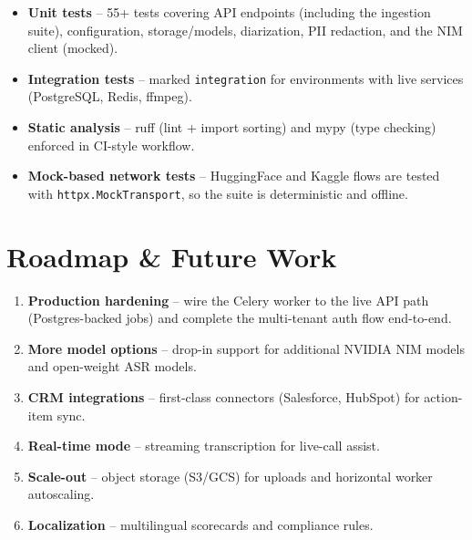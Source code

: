 \documentclass[11pt,a4paper]{article}
\begin{document}
\begin{itemize}
  \item \textbf{Unit tests} -- 55+ tests covering API endpoints (including the ingestion
        suite), configuration, storage/models, diarization, PII redaction, and the NIM
        client (mocked).
  \item \textbf{Integration tests} -- marked \texttt{integration} for environments with
        live services (PostgreSQL, Redis, ffmpeg).
  \item \textbf{Static analysis} -- ruff (lint + import sorting) and mypy (type checking)
        enforced in CI-style workflow.
  \item \textbf{Mock-based network tests} -- HuggingFace and Kaggle flows are tested with
        \texttt{httpx.MockTransport}, so the suite is deterministic and offline.
\end{itemize}

\section{Roadmap \& Future Work}

\begin{enumerate}
  \item \textbf{Production hardening} -- wire the Celery worker to the live API path
        (Postgres-backed jobs) and complete the multi-tenant auth flow end-to-end.
  \item \textbf{More model options} -- drop-in support for additional NVIDIA NIM models
        and open-weight ASR models.
  \item \textbf{CRM integrations} -- first-class connectors (Salesforce, HubSpot) for
        action-item sync.
  \item \textbf{Real-time mode} -- streaming transcription for live-call assist.
  \item \textbf{Scale-out} -- object storage (S3/GCS) for uploads and horizontal worker
        autoscaling.
  \item \textbf{Localization} -- multilingual scorecards and compliance rules.
\end{enumerate}

\end{document}
